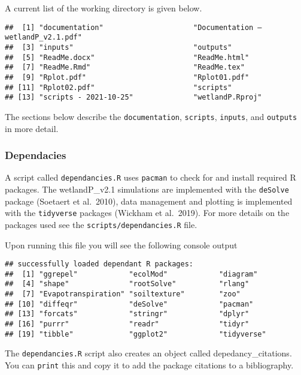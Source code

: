 \documentclass[
]{article}
\begin{document}
A current list of the working directory is given below.

\begin{verbatim}
##  [1] "documentation"                     "Documentation – wetlandP_v2.1.pdf"
##  [3] "inputs"                            "outputs"                          
##  [5] "ReadMe.docx"                       "ReadMe.html"                      
##  [7] "ReadMe.Rmd"                        "ReadMe.tex"                       
##  [9] "Rplot.pdf"                         "Rplot01.pdf"                      
## [11] "Rplot02.pdf"                       "scripts"                          
## [13] "scripts - 2021-10-25"              "wetlandP.Rproj"
\end{verbatim}

The sections below describe the \texttt{documentation},
\texttt{scripts}, \texttt{inputs}, and \texttt{outputs} in more detail.

\hypertarget{dependacies}{%
\subsubsection{Dependacies}\label{dependacies}}

A script called \texttt{dependancies.R} uses \texttt{pacman} to check
for and install required R packages. The wetlandP\_v2.1 simulations are
implemented with the \texttt{deSolve} package (Soetaert et al.~2010),
data management and plotting is implemented with the \texttt{tidyverse}
packages (Wickham et al.~2019). For more details on the packages used
see the \texttt{scripts/dependancies.R} file.

Upon running this file you will see the following console output

\begin{verbatim}
## successfully loaded dependant R packages:
##  [1] "ggrepel"            "ecolMod"            "diagram"           
##  [4] "shape"              "rootSolve"          "rlang"             
##  [7] "Evapotranspiration" "soiltexture"        "zoo"               
## [10] "diffeqr"            "deSolve"            "pacman"            
## [13] "forcats"            "stringr"            "dplyr"             
## [16] "purrr"              "readr"              "tidyr"             
## [19] "tibble"             "ggplot2"            "tidyverse"
\end{verbatim}

The \texttt{dependancies.R} script also creates an object called
depedancy\_citations. You can \texttt{print} this and copy it to add the
package citations to a bibliography.
\end{document}
